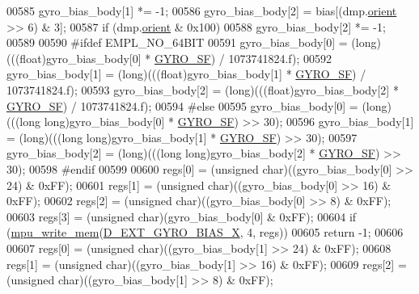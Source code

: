 \begin{DoxyCode}
00585         gyro\_bias\_body[1] *= -1;
00586     gyro\_bias\_body[2] = bias[(dmp.\hyperlink{structdmp__s_ac949b11ebfe17c3a2ac42785a1437c25}{orient} >> 6) & 3];
00587     \textcolor{keywordflow}{if} (dmp.\hyperlink{structdmp__s_ac949b11ebfe17c3a2ac42785a1437c25}{orient} & 0x100)
00588         gyro\_bias\_body[2] *= -1;
00589 
00590 \textcolor{preprocessor}{#ifdef EMPL\_NO\_64BIT}
00591     gyro\_bias\_body[0] = (long)(((\textcolor{keywordtype}{float})gyro\_bias\_body[0] * \hyperlink{group___d_r_i_v_e_r_s_gac0325c658f2911bdfc3b44fca31c684f}{GYRO\_SF}) / 1073741824.f);
00592     gyro\_bias\_body[1] = (long)(((\textcolor{keywordtype}{float})gyro\_bias\_body[1] * \hyperlink{group___d_r_i_v_e_r_s_gac0325c658f2911bdfc3b44fca31c684f}{GYRO\_SF}) / 1073741824.f);
00593     gyro\_bias\_body[2] = (long)(((\textcolor{keywordtype}{float})gyro\_bias\_body[2] * \hyperlink{group___d_r_i_v_e_r_s_gac0325c658f2911bdfc3b44fca31c684f}{GYRO\_SF}) / 1073741824.f);
00594 \textcolor{preprocessor}{#else}
00595     gyro\_bias\_body[0] = (long)(((\textcolor{keywordtype}{long} \textcolor{keywordtype}{long})gyro\_bias\_body[0] * \hyperlink{group___d_r_i_v_e_r_s_gac0325c658f2911bdfc3b44fca31c684f}{GYRO\_SF}) >> 30);
00596     gyro\_bias\_body[1] = (long)(((\textcolor{keywordtype}{long} \textcolor{keywordtype}{long})gyro\_bias\_body[1] * \hyperlink{group___d_r_i_v_e_r_s_gac0325c658f2911bdfc3b44fca31c684f}{GYRO\_SF}) >> 30);
00597     gyro\_bias\_body[2] = (long)(((\textcolor{keywordtype}{long} \textcolor{keywordtype}{long})gyro\_bias\_body[2] * \hyperlink{group___d_r_i_v_e_r_s_gac0325c658f2911bdfc3b44fca31c684f}{GYRO\_SF}) >> 30);
00598 \textcolor{preprocessor}{#endif}
00599 
00600     regs[0] = (\textcolor{keywordtype}{unsigned} char)((gyro\_bias\_body[0] >> 24) & 0xFF);
00601     regs[1] = (\textcolor{keywordtype}{unsigned} char)((gyro\_bias\_body[0] >> 16) & 0xFF);
00602     regs[2] = (\textcolor{keywordtype}{unsigned} char)((gyro\_bias\_body[0] >> 8) & 0xFF);
00603     regs[3] = (\textcolor{keywordtype}{unsigned} char)(gyro\_bias\_body[0] & 0xFF);
00604     \textcolor{keywordflow}{if} (\hyperlink{group___d_r_i_v_e_r_s_gafea59910bc3dd30ba3356b1c75213a5f}{mpu\_write\_mem}(\hyperlink{group___d_r_i_v_e_r_s_gae48ad5d76a4abec0759ff23ba2b2a68e}{D\_EXT\_GYRO\_BIAS\_X}, 4, regs))
00605         \textcolor{keywordflow}{return} -1;
00606 
00607     regs[0] = (\textcolor{keywordtype}{unsigned} char)((gyro\_bias\_body[1] >> 24) & 0xFF);
00608     regs[1] = (\textcolor{keywordtype}{unsigned} char)((gyro\_bias\_body[1] >> 16) & 0xFF);
00609     regs[2] = (\textcolor{keywordtype}{unsigned} char)((gyro\_bias\_body[1] >> 8) & 0xFF);

\end{DoxyCode}
